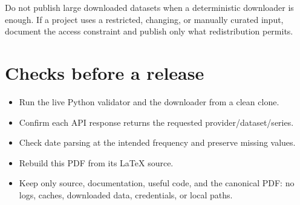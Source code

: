 \documentclass[11pt,a4paper]{article}
\begin{document}
Do not publish large downloaded datasets when a deterministic downloader is
enough. If a project uses a restricted, changing, or manually curated input,
document the access constraint and publish only what redistribution permits.

\section{Checks before a release}

\begin{itemize}
\item Run the live Python validator and the downloader from a clean clone.
\item Confirm each API response returns the requested provider/dataset/series.
\item Check date parsing at the intended frequency and preserve missing values.
\item Rebuild this PDF from its \LaTeX{} source.
\item Keep only source, documentation, useful code, and the canonical PDF:
      no logs, caches, downloaded data, credentials, or local paths.
\end{itemize}
\end{document}
